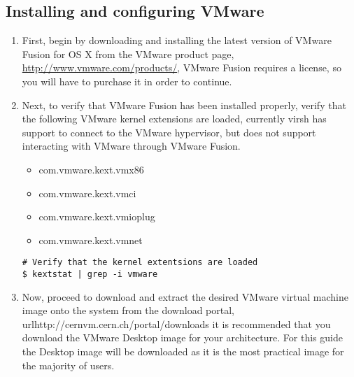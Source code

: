 \subsection{Installing and configuring VMware}
\label{sec:osxvmware}
\begin{enumerate}
\item	First, begin by downloading and installing the latest version of VMware Fusion for OS X from the VMware product 
		page, \url{http://www.vmware.com/products/}, VMware Fusion requires a license, so you will have to purchase it
		in order to continue.
		
\item	Next, to verify that VMware Fusion has been installed properly, verify that the following VMware kernel extensions 
		are loaded, currently virsh has support to connect to the VMware hypervisor, but does not support interacting with
		VMware through VMware Fusion.
		
\begin{itemize}
\item	com.vmware.kext.vmx86
\item	com.vmware.kext.vmci
\item	com.vmware.kext.vmioplug
\item	com.vmware.kext.vmnet
\end{itemize}

\lstset{language=bash,caption=Verify VMware Kernel Extensions Loaded}
\begin{lstlisting}
# Verify that the kernel extentsions are loaded
$ kextstat | grep -i vmware
\end{lstlisting}

\item	Now, proceed to download and extract the desired VMware virtual machine image onto the system from the \cernvm download 
		portal, url{http://cernvm.cern.ch/portal/downloads} it is recommended that you download the VMware Desktop image for your 
		architecture. For this guide the Desktop image will be downloaded as it is the most practical image for the majority of 
		users.


\end{enumerate}





